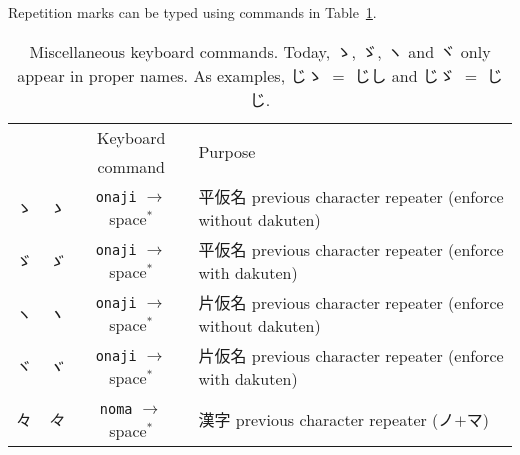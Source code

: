 \documentclass[../nihongo-gakushuu-kyouzai.tex]{subfiles}
\begin{document}
Repetition marks can be typed using commands in Table~\ref{tbl:miscellaneous-keyboard-commands}.
\begin{table}[h]
\centering
\begin{tabular}{@{}cccl@{}}
    \toprule
    \multicolumn{2}{c}{\multirow{2}{*}{}} & Keyboard & \multirow{2}{*}{Purpose} \\
    \multicolumn{2}{c}{}                  & command  & \\ \midrule
    ゝ & \emph{ゝ} & \texttt{onaji} $\to$ space$^\texttt{*}$ & 平仮名 previous character repeater (enforce without dakuten) \\
    ゞ & \emph{ゞ} & \texttt{onaji} $\to$ space$^\texttt{*}$ & 平仮名 previous character repeater (enforce with dakuten)\\
    ヽ & \emph{ヽ} & \texttt{onaji} $\to$ space$^\texttt{*}$ & 片仮名 previous character repeater (enforce without dakuten)\\
    ヾ & \emph{ヾ} & \texttt{onaji} $\to$ space$^\texttt{*}$ & 片仮名 previous character repeater (enforce with dakuten)\\
    々 & \emph{々} & \texttt{noma} $\to$ space$^\texttt{*}$ & 漢字 previous character repeater (ノ$+$マ) \\
    \bottomrule
\end{tabular}%
\caption{Miscellaneous keyboard commands. Today, ゝ, ゞ, ヽ and ヾ only appear in proper names. As examples, じゝ $=$ じし and じゞ $=$ じじ.}
\label{tbl:miscellaneous-keyboard-commands}
\end{table}
\end{document}
